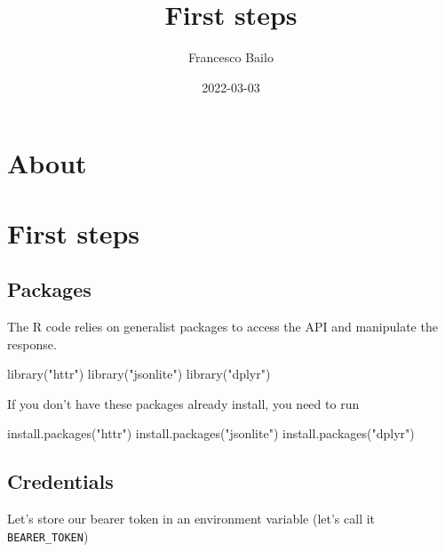 \documentclass[
]{article}
\title{First steps}
\author{Francesco Bailo}
\date{2022-03-03}
\newenvironment{Shaded}{\begin{snugshade}}{\end{snugshade}}
\newcommand{\FunctionTok}[1]{\textcolor[rgb]{0.00,0.00,0.00}{#1}}
\newcommand{\NormalTok}[1]{#1}
\newcommand{\StringTok}[1]{\textcolor[rgb]{0.31,0.60,0.02}{#1}}
\begin{document}
\maketitle

{
\setcounter{tocdepth}{2}
\tableofcontents
}
\hypertarget{about}{%
\section{About}\label{about}}

\hypertarget{first-steps}{%
\section{First steps}\label{first-steps}}

\hypertarget{packages}{%
\subsection{Packages}\label{packages}}

The R code relies on generalist packages to access the API and manipulate the response.

\begin{Shaded}
\begin{Highlighting}[]
\FunctionTok{library}\NormalTok{(}\StringTok{"httr"}\NormalTok{)}
\FunctionTok{library}\NormalTok{(}\StringTok{"jsonlite"}\NormalTok{)}
\FunctionTok{library}\NormalTok{(}\StringTok{"dplyr"}\NormalTok{)}
\end{Highlighting}
\end{Shaded}

If you don't have these packages already install, you need to run

\begin{Shaded}
\begin{Highlighting}[]
\FunctionTok{install.packages}\NormalTok{(}\StringTok{"httr"}\NormalTok{)}
\FunctionTok{install.packages}\NormalTok{(}\StringTok{"jsonlite"}\NormalTok{)}
\FunctionTok{install.packages}\NormalTok{(}\StringTok{"dplyr"}\NormalTok{)}
\end{Highlighting}
\end{Shaded}

\hypertarget{credentials}{%
\subsection{Credentials}\label{credentials}}

Let's store our bearer token in an environment variable (let's call it \texttt{BEARER\_TOKEN})
\end{document}

